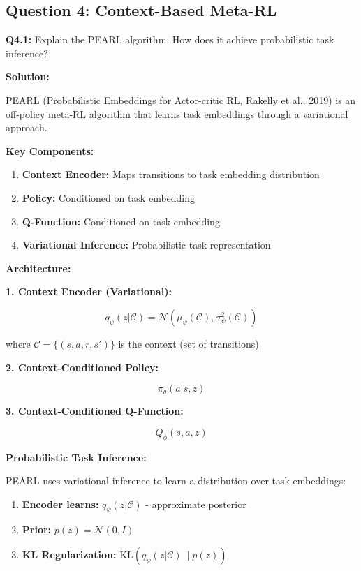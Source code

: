 \documentclass[12pt]{article}
\begin{document}
{{			\subsection{Question 4: Context-Based Meta-RL}
			
			\textbf{Q4.1:} Explain the PEARL algorithm. How does it achieve probabilistic task inference?
			
			\textbf{Solution:}
			
			PEARL (Probabilistic Embeddings for Actor-critic RL, Rakelly et al., 2019) is an off-policy meta-RL algorithm that learns task embeddings through a variational approach.
			
			\textbf{Key Components:}
			
			\begin{enumerate}
				\item \textbf{Context Encoder:} Maps transitions to task embedding distribution
				\item \textbf{Policy:} Conditioned on task embedding
				\item \textbf{Q-Function:} Conditioned on task embedding
				\item \textbf{Variational Inference:} Probabilistic task representation
			\end{enumerate}
			
			\textbf{Architecture:}
			
			\textbf{1. Context Encoder (Variational):}
			
			$$q_\psi(z|\mathcal{C}) = \mathcal{N}(\mu_\psi(\mathcal{C}), \sigma_\psi^2(\mathcal{C}))$$
			
			where $\mathcal{C} = \{(s, a, r, s')\}$ is the context (set of transitions)
			
			\textbf{2. Context-Conditioned Policy:}
			
			$$\pi_\theta(a|s, z)$$
			
			\textbf{3. Context-Conditioned Q-Function:}
			
			$$Q_\phi(s, a, z)$$
			
			\textbf{Probabilistic Task Inference:}
			
			PEARL uses variational inference to learn a distribution over task embeddings:
			
			\begin{enumerate}
				\item \textbf{Encoder learns:} $q_\psi(z|\mathcal{C})$ - approximate posterior
				\item \textbf{Prior:} $p(z) = \mathcal{N}(0, I)$
				\item \textbf{KL Regularization:} $\text{KL}(q_\psi(z|\mathcal{C}) \| p(z))$
			\end{enumerate}
			
}}
\end{document}

